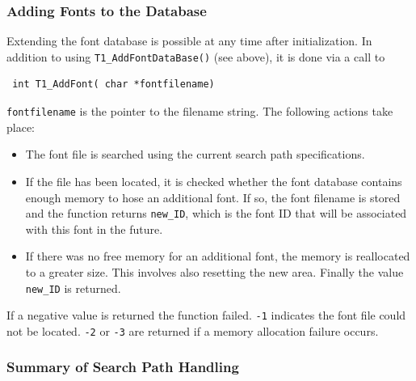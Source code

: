 \subsubsection{Adding Fonts to the Database} 
\label{addingfonts}%
Extending the font database is possible at any time after initialization. In
addition to using \verb+T1_AddFontDataBase()+ (see above), it is done via a
call to \precorr
\begin{verbatim}
 int T1_AddFont( char *fontfilename)
\end{verbatim}\postcorr
\verb+fontfilename+ is the pointer to the filename string. The following
actions take place:
\begin{itemize}
\item The font file is searched using the current search path specifications. 
\item If the file has been located, it is checked whether the font database
  contains enough memory to hose an additional font. 
  If so, the font filename
  is stored and the function returns \verb+new_ID+, which is the font ID that
  will be associated with this font in the future. 
\item If there was no free memory for an additional font, the memory is
  reallocated to a greater size. This involves also resetting the new
  area. Finally the value \verb+new_ID+ is returned.
\end{itemize}
If a negative value is returned the function failed. \verb+-1+ indicates the
font file could not be located. \verb+-2+ or \verb+-3+ are returned if a
memory allocation failure occurs.


\subsubsection{Summary of Search Path Handling}

